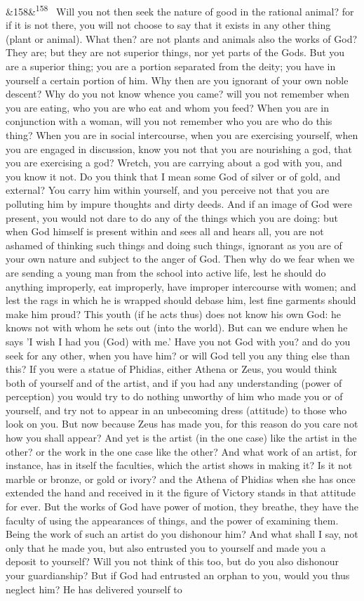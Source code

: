 \documentclass[12pt]{article}
\newcommand{\para}[1][]{\par\noindent\ifx&#1&\else\textsuperscript{\footnotesize #1}~\fi}
\begin{document}
\para[158] Will you not then seek the nature of good in the rational animal? for if it is not there, you will not choose to say that it exists in any other thing (plant or animal). What then? are not plants and animals also the works of God? They are; but they are not superior things, nor yet parts of the Gods. But you are a superior thing; you are a portion separated from the deity; you have in yourself a certain portion of him. Why then are you ignorant of your own noble descent? Why do you not know whence you came? will you not remember when you are eating, who you are who eat and whom you feed? When you are in conjunction with a woman, will you not remember who you are who do this thing? When you are in social intercourse, when you are exercising yourself, when you are engaged in discussion, know you not that you are nourishing a god, that you are exercising a god? Wretch, you are carrying about a god with you, and you know it not. Do you think that I mean some God of silver or of gold, and external? You carry him within yourself, and you perceive not that you are polluting him by impure thoughts and dirty deeds. And if an image of God were present, you would not dare to do any of the things which you are doing: but when God himself is present within and sees all and hears all, you are not ashamed of thinking such things and doing such things, ignorant as you are of your own nature and subject to the anger of God. Then why do we fear when we are sending a young man from the school into active life, lest he should do anything improperly, eat improperly, have improper intercourse with women; and lest the rags in which he is wrapped should debase him, lest fine garments should make him proud? This youth (if he acts thus) does not know his own God: he knows not with whom he sets out (into the world). But can we endure when he says 'I wish I had you (God) with me.' Have you not God with you? and do you seek for any other, when you have him? or will God tell you any thing else than this? If you were a statue of Phidias, either Athena or Zeus, you would think both of yourself and of the artist, and if you had any understanding (power of perception) you would try to do nothing unworthy of him who made you or of yourself, and try not to appear in an unbecoming dress (attitude) to those who look on you. But now because Zeus has made you, for this reason do you care not how you shall appear? And yet is the artist (in the one case) like the artist in the other? or the work in the one case like the other? And what work of an artist, for instance, has in itself the faculties, which the artist shows in making it? Is it not marble or bronze, or gold or ivory? and the Athena of Phidias when she has once extended the hand and received in it the figure of Victory stands in that attitude for ever. But the works of God have power of motion, they breathe, they have the faculty of using the appearances of things, and the power of examining them. Being the work of such an artist do you dishonour him? And what shall I say, not only that he made you, but also entrusted you to yourself and made you a deposit to yourself? Will you not think of this too, but do you also dishonour your guardianship? But if God had entrusted an orphan to you, would you thus neglect him? He has delivered yourself to 
\end{document}
